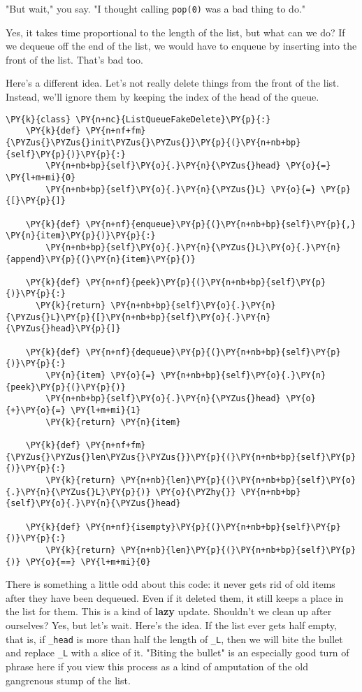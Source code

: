 "But wait," you say.  "I thought calling \texttt{pop(0)} was a bad thing to do."  


Yes, it takes time proportional to the length of the list, but what can we do?  If we dequeue off the end of the list, we would have to enqueue by inserting into the front of the list.  That's bad too.


Here's a different idea.  Let's not really delete things from the front of the list.  Instead, we'll ignore them by keeping the index of the head of the queue.

\begin{Verbatim}[commandchars=\\\{\}]
\PY{k}{class} \PY{n+nc}{ListQueueFakeDelete}\PY{p}{:}
    \PY{k}{def} \PY{n+nf+fm}{\PYZus{}\PYZus{}init\PYZus{}\PYZus{}}\PY{p}{(}\PY{n+nb+bp}{self}\PY{p}{)}\PY{p}{:}
        \PY{n+nb+bp}{self}\PY{o}{.}\PY{n}{\PYZus{}head} \PY{o}{=} \PY{l+m+mi}{0}
        \PY{n+nb+bp}{self}\PY{o}{.}\PY{n}{\PYZus{}L} \PY{o}{=} \PY{p}{[}\PY{p}{]}

    \PY{k}{def} \PY{n+nf}{enqueue}\PY{p}{(}\PY{n+nb+bp}{self}\PY{p}{,} \PY{n}{item}\PY{p}{)}\PY{p}{:}
        \PY{n+nb+bp}{self}\PY{o}{.}\PY{n}{\PYZus{}L}\PY{o}{.}\PY{n}{append}\PY{p}{(}\PY{n}{item}\PY{p}{)}

    \PY{k}{def} \PY{n+nf}{peek}\PY{p}{(}\PY{n+nb+bp}{self}\PY{p}{)}\PY{p}{:}
      \PY{k}{return} \PY{n+nb+bp}{self}\PY{o}{.}\PY{n}{\PYZus{}L}\PY{p}{[}\PY{n+nb+bp}{self}\PY{o}{.}\PY{n}{\PYZus{}head}\PY{p}{]}

    \PY{k}{def} \PY{n+nf}{dequeue}\PY{p}{(}\PY{n+nb+bp}{self}\PY{p}{)}\PY{p}{:}
        \PY{n}{item} \PY{o}{=} \PY{n+nb+bp}{self}\PY{o}{.}\PY{n}{peek}\PY{p}{(}\PY{p}{)}
        \PY{n+nb+bp}{self}\PY{o}{.}\PY{n}{\PYZus{}head} \PY{o}{+}\PY{o}{=} \PY{l+m+mi}{1}
        \PY{k}{return} \PY{n}{item}

    \PY{k}{def} \PY{n+nf+fm}{\PYZus{}\PYZus{}len\PYZus{}\PYZus{}}\PY{p}{(}\PY{n+nb+bp}{self}\PY{p}{)}\PY{p}{:}
        \PY{k}{return} \PY{n+nb}{len}\PY{p}{(}\PY{n+nb+bp}{self}\PY{o}{.}\PY{n}{\PYZus{}L}\PY{p}{)} \PY{o}{\PYZhy{}} \PY{n+nb+bp}{self}\PY{o}{.}\PY{n}{\PYZus{}head}

    \PY{k}{def} \PY{n+nf}{isempty}\PY{p}{(}\PY{n+nb+bp}{self}\PY{p}{)}\PY{p}{:}
        \PY{k}{return} \PY{n+nb}{len}\PY{p}{(}\PY{n+nb+bp}{self}\PY{p}{)} \PY{o}{==} \PY{l+m+mi}{0}
\end{Verbatim}



There is something a little odd about this code: it never gets rid of old items after they have been dequeued.  Even if it deleted them, it still keeps a place in the list for them.  This is a kind of \textbf{lazy} update.  Shouldn't we clean up after ourselves?  Yes, but let's wait.  Here's the idea.  If the list ever gets half empty, that is, if \texttt{\_head} is more than half the length of \texttt{\_L}, then we will bite the bullet and replace \texttt{\_L} with a slice of it.  "Biting the bullet" is an especially good turn of phrase here if you view this process as a kind of amputation of the old gangrenous stump of the list.

